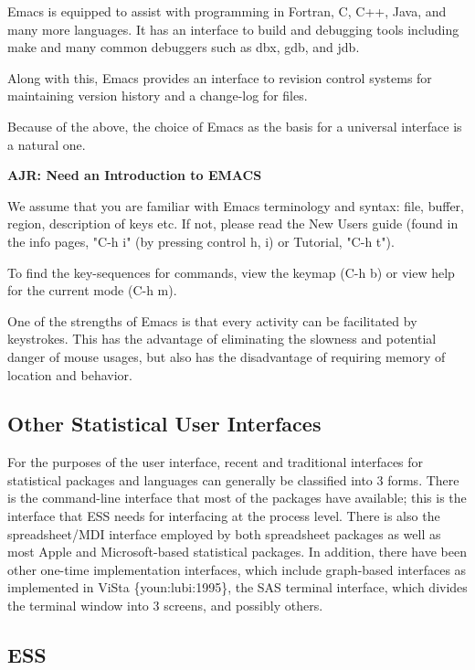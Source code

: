 \documentclass{article}
\newcommand{\citep}[1]{{\{\sf#1\}}}
\begin{document}
Emacs is equipped to assist with programming in Fortran, C, C++, Java,
and many more languages.  It has an interface to build and debugging
tools including make and many common debuggers such as dbx, gdb, and
jdb. 

Along with this, Emacs provides an interface to revision control
systems for maintaining version history and a change-log for files.

Because of the above, the choice of Emacs as the basis for a universal
interface is a natural one.  


\textbf{AJR: Need an Introduction to EMACS}

We assume that you are familiar with Emacs terminology and syntax:
file, buffer, region, description of keys etc.  If not, please read
the New Users guide (found in the info pages, "C-h i" (by pressing
control h, i) or Tutorial, "C-h t").

To find the key-sequences for commands, view the keymap (C-h b) or
view help for the current mode (C-h m).  

One of the strengths of Emacs is that every activity can be
facilitated by keystrokes.  This has the advantage of eliminating the
slowness and potential danger of mouse usages, but also has the
disadvantage of requiring memory of location and behavior.

\subsection{Other Statistical User Interfaces}
\label{sec:intro:UI}

For the purposes of the user interface, recent and traditional
interfaces for statistical packages and languages can generally be
classified into 3 forms.  There is the command-line interface that
most of the packages have available; this is the interface that ESS
needs for interfacing at the process level.  There is also the
spreadsheet/MDI interface employed by both spreadsheet packages as
well as most Apple and Microsoft-based statistical packages.  In
addition, there have been other one-time implementation interfaces,
which include graph-based interfaces as implemented in ViSta
\citep{youn:lubi:1995}, the SAS terminal interface, which divides the
terminal window into 3 screens, and possibly others.

\subsection{ESS}
\label{sec:intro:ESS}
\end{document}
